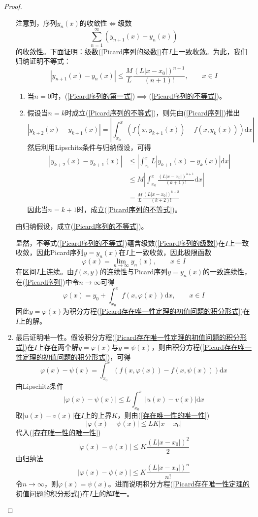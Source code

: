 \documentclass[lang = cn, scheme = chinese, thmcnt = section]{elegantbook}
\newcommand{\dd}{\mathrm{d}}           %
\begin{document}
\begin{proof}
\begin{enumerate}
		注意到，序列$y_n(x)$的收敛性$\iff$级数
		\begin{equation*}
			\sum_{n=1}^{\infty}(y_{n+1}(x)-y_n(x))
			\label{Picard序列的级数}
			\tag{5}
		\end{equation*}
		的收敛性。下面证明：级数(\ref{Picard序列的级数})在$I$上一致收敛。为此，我们归纳证明不等式：
		\begin{equation*}
			|y_{n+1}(x)-y_n(x)|\le\frac{M}{L}\frac{(L|x-x_0|)^{n+1}}{(n+1)!},\qquad x\in I
			\label{Picard序列的不等式}
			\tag{6}
		\end{equation*}
		\begin{enumerate}
			\item 当$n=0$时，(\ref{Picard序列的第一式})$\implies$(\ref{Picard序列的不等式})。
			\item 假设当$n=k$时成立(\ref{Picard序列的不等式})，则先由(\ref{Picard序列})推出%
			$$
			|y_{k+2}(x)-y_{k+1}(x)|
			=\left|\int_{x_0}^{x}(f(x,y_{k+1}(x))-f(x,y_k(x)))\dd x\right|
			$$
			然后利用Lipschitz条件与归纳假设，可得
			\begin{align*}
				|y_{k+2}(x)-y_{k+1}(x)|
				& \le \left|\int_{x_0}^{x}L|y_{k+1}(x)-y_k(x)|\dd x\right| \\
				& \le M \left| \int_{x_0}^{x}\frac{(L|x-x_0|)^{k+1}}{(k+1)!}\dd x \right| \\
				& = \frac{M}{L}\frac{(L|x-x_0|)^{k+2}}{(k+2)!}
			\end{align*}
			因此当$n=k+1$时，成立(\ref{Picard序列的不等式})。
		\end{enumerate}
		由归纳假设，成立(\ref{Picard序列的不等式})。
		
		显然，不等式(\ref{Picard序列的不等式})蕴含级数(\ref{Picard序列的级数})在$I$上一致收敛，因此Picard序列$y=y_n(x)$在$I$上一致收敛，因此极限函数%
		$$
		\varphi(x)=\lim_{n\to\infty}y_n(x),\qquad x\in I
		$$
		在区间$I$上连续。由$f(x,y)$的连续性与Picard序列$y=y_n(x)$的一致连续性，在(\ref{Picard序列})中令$n\to\infty$可得%
		$$
		\varphi(x)=y_0+\int_{x_0}^{x}f(x,\varphi(x))\dd x,\qquad x\in I
		$$
		因此$y=\varphi(x)$为积分方程(\ref{Picard存在唯一性定理的初值问题的积分形式})在$I$上的解。
		\item 最后证明唯一性。假设积分方程(\ref{Picard存在唯一性定理的初值问题的积分形式})在$I$上存在两个解$y=\varphi(x)$与$y=\psi(x)$，则由积分方程(\ref{Picard存在唯一性定理的初值问题的积分形式})，可得%
		$$
		\varphi(x)-\psi(x)
		=\int_{x_0}^{x}(f(x,\varphi(x))-f(x,\psi(x)))\dd x
		$$
		由Lipschitz条件
		\begin{equation*}
			|\varphi(x)-\psi(x)|
			\le L\int_{x_0}^{x}|u(x)-v(x)|\dd x
			\label{存在唯一性的唯一性}
			\tag{7}
		\end{equation*}
		取$|u(x)-v(x)|$在$I$上的上界$K$，则由(\ref{存在唯一性的唯一性})
		$$
		|\varphi(x)-\psi(x)|
		\le LK|x-x_0|
		$$
		代入(\ref{存在唯一性的唯一性})
		$$
		|\varphi(x)-\psi(x)|
		\le K\frac{(L|x-x_0|)^2}{2}
		$$
		由归纳法%
		$$
		|\varphi(x)-\psi(x)|
		\le K\frac{(L|x-x_0|)^n}{n!}
		$$
		令$n\to\infty$，则$\varphi(x)=\psi(x)$。进而说明积分方程(\ref{Picard存在唯一性定理的初值问题的积分形式})在$I$上的解唯一。
	\end{enumerate}
\end{proof}
\end{document}
